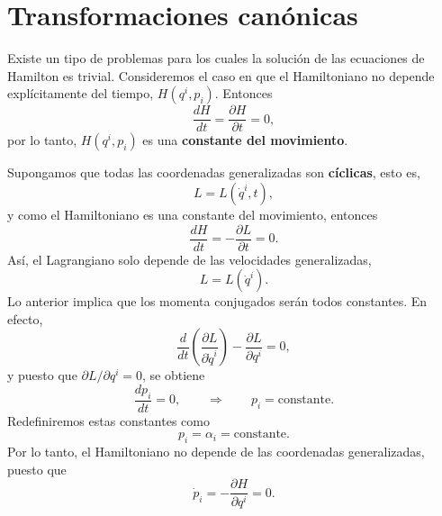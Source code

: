 \documentclass[../apunte_mecanica_clasica.tex]{subfiles}
\begin{document}
\chapter{Transformaciones canónicas}
\label{ch:transformaciones-canonicas}

Existe un tipo de problemas para los cuales la solución de las ecuaciones de Hamilton es trivial. Consideremos el caso en que el Hamiltoniano no depende explícitamente del tiempo,
\(H(q^i,p_i)\). Entonces
\begin{equation}
    \frac{dH}{dt}=\frac{\partial H}{\partial t}=0,
    \label{eq:tc-h-conservado}
\end{equation}
por lo tanto, \(H(q^i,p_i)\) es una \textbf{constante del movimiento}.

Supongamos que todas las coordenadas generalizadas son \textbf{cíclicas}, esto es,
\begin{equation}
    L=L(\dot q^i,t),
    \label{eq:tc-lagrangiano-coordenadas-ciclicas}
\end{equation}
y como el Hamiltoniano es una constante del movimiento, entonces
\begin{equation}
    \frac{dH}{dt}=-\frac{\partial L}{\partial t}=0.
    \label{eq:tc-h-l-tiempo}
\end{equation}
Así, el Lagrangiano solo depende de las velocidades generalizadas,
\begin{equation}
    L=L(\dot q^i).
    \label{eq:tc-l-depende-solo-velocidades}
\end{equation}
Lo anterior implica que los momenta conjugados serán todos constantes. En efecto,
\begin{equation}
    \frac{d}{dt}\left(\frac{\partial L}{\partial \dot q^i}\right)-\frac{\partial L}{\partial q^i}=0,
    \label{eq:tc-el-ciclica}
\end{equation}
y puesto que \(\partial L/\partial q^i=0\), se obtiene
\begin{equation}
    \frac{dp_i}{dt}=0,
    \qquad\Rightarrow\qquad
    p_i=\text{constante}.
    \label{eq:tc-momenta-constantes}
\end{equation}
Redefiniremos estas constantes como
\begin{equation}
    p_i=\alpha_i=\text{constante}.
    \label{eq:tc-alpha-constante}
\end{equation}
Por lo tanto, el Hamiltoniano no depende de las coordenadas generalizadas, puesto que
\begin{equation}
    \dot p_i=-\frac{\partial H}{\partial q^i}=0.
    \label{eq:tc-h-no-depende-q}
\end{equation}
\end{document}
